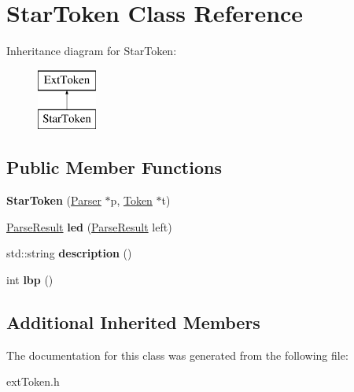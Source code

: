 \hypertarget{class_star_token}{}\section{Star\+Token Class Reference}
\label{class_star_token}
Inheritance diagram for Star\+Token\+:\begin{figure}[H]
\begin{center}
\leavevmode
\includegraphics[height=2.000000cm]{class_star_token}
\end{center}
\end{figure}
\subsection*{Public Member Functions}
\begin{DoxyCompactItemize}
\item 
\hypertarget{class_star_token_a9e448a924eb2adbfde602c0590268afd}{}{\bfseries Star\+Token} (\hyperlink{class_parser}{Parser} $\ast$p, \hyperlink{class_token}{Token} $\ast$t)\label{class_star_token_a9e448a924eb2adbfde602c0590268afd}

\item 
\hypertarget{class_star_token_aba82bdc81500a58096bfeedad600ad10}{}\hyperlink{class_parse_result}{Parse\+Result} {\bfseries led} (\hyperlink{class_parse_result}{Parse\+Result} left)\label{class_star_token_aba82bdc81500a58096bfeedad600ad10}

\item 
\hypertarget{class_star_token_a59b81cb08057d75eca4b9a8aad8e2be1}{}std\+::string {\bfseries description} ()\label{class_star_token_a59b81cb08057d75eca4b9a8aad8e2be1}

\item 
\hypertarget{class_star_token_a87682a46d434781795d060e43e7eae23}{}int {\bfseries lbp} ()\label{class_star_token_a87682a46d434781795d060e43e7eae23}

\end{DoxyCompactItemize}
\subsection*{Additional Inherited Members}


The documentation for this class was generated from the following file\+:\begin{DoxyCompactItemize}
\item 
ext\+Token.\+h\end{DoxyCompactItemize}
